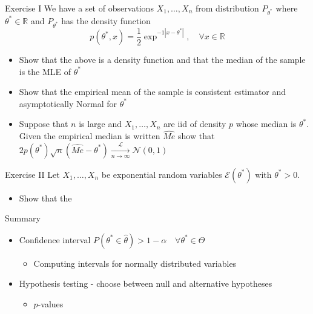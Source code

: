 \documentclass{beamer}
\begin{document}
\begin{frame}{Exercise I} 
We have a set of observations $X_1, \ldots, X_n$ from distribution $P_{\theta^*}$ where $\theta^* \in \mathbb{R}$ and  $P_{\theta^*}$ has the density function 
\begin{displaymath} 
p(\theta^*, x) = \frac{1}{2} \exp^{-1|x - \theta^*|}, \quad \forall x \in \mathbb{R} 
\end{displaymath}
\begin{itemize} 
 \item Show that the above is a density function and that the median of the sample is the MLE of $\theta^*$ 
 \item Show that the empirical mean of the sample is consistent estimator and asymptotically Normal for $\theta^*$ 
 \item Suppose that $n$ is large and $X_1, \ldots, X_n$ are iid of density $p$ whose median is $\theta^*$. Given the empirical median is written $\hat{Me}$ show that $2p(\theta^*)\sqrt{n}(\hat{Me} - \theta^*) \xrightarrow[n \rightarrow \infty]{\mathcal{L}} \mathcal{N}(0, 1)$ 
\end{itemize}
\end{frame}

\begin{frame}{Exercise II}  
Let $X_1, \ldots, X_n$ be exponential random variables $\mathcal{E}(\theta^*)$ with $\theta^* > 0$. 
\begin{itemize} 
 \item Show that the 
\end{itemize}

\end{frame}

\begin{frame}{Summary}
\begin{itemize} 
 \item Confidence interval  $P(\theta^* \in \hat{\theta}) > 1 - \alpha \quad \forall \theta^* \in \Theta $
 \begin{itemize}
 \item Computing intervals for normally distributed variables 
  \end{itemize}
 \item Hypothesis testing - choose between null and alternative hypotheses 
  \begin{itemize}
 \item $p$-values 
  \end{itemize}
\end{itemize}
\end{frame}
\end{document}
